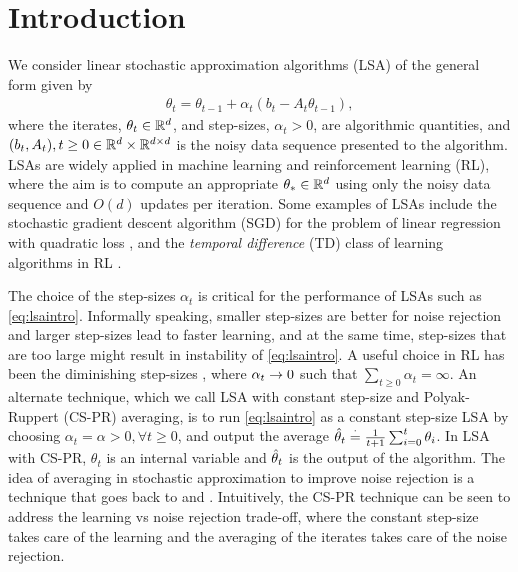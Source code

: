 \section{Introduction}
We consider linear stochastic approximation algorithms (LSA) of the general form given by
\begin{align}\label{eq:lsaintro}
\theta_t=\theta_{t-1}+\alpha_t (b_t-A_t \theta_{t-1}),
\end{align}
where the iterates, $\theta_t\in \mathbb{R}^d$, and step-sizes, $\alpha_t>0$, are algorithmic quantities, and $(b_t,A_t), t\geq 0\in \mathbb{R}^d\times \mathbb{R}^{d \times d}$ is the noisy data sequence presented to the algorithm.
LSAs are widely applied in machine learning and reinforcement learning (RL), where the aim is to compute an appropriate $\theta_*\in \mathbb{R}^d$ using only the noisy data sequence and $O(d)$ updates per iteration. Some examples of LSAs include the stochastic gradient descent algorithm (SGD) for the problem of linear regression with quadratic loss \cite{bach,bachaistats}, and the \emph{temporal difference} (TD) class of learning algorithms in RL \cite{sutton,konda-tsitsiklis,gtd,gtd2,gtdmp}.\par

The choice of the step-sizes $\alpha_t$ is critical for the performance of LSAs such as \eqref{eq:lsaintro}.
Informally speaking, smaller step-sizes are better for noise rejection and larger step-sizes lead to faster learning, and at the same time, step-sizes that are too large might result in instability of \eqref{eq:lsaintro}. A useful choice in RL has been the diminishing step-sizes \cite{gtd2,gtdmp,konda-tsitsiklis}, where $\alpha_t\rightarrow 0$ such that $\sum_{t\geq 0} \alpha_t=\infty$. An alternate technique, which we call LSA with constant step-size and Polyak-Ruppert (CS-PR) averaging, is to run \eqref{eq:lsaintro} as a constant step-size LSA by choosing $\alpha_t=\alpha>0,\forall t\geq 0$, and output the average $\hat{\theta}_t\stackrel{\cdot}{=}\frac{1}{t+1}\sum_{i=0}^t \theta_i$. In LSA with CS-PR, $\theta_t$ is an internal variable and $\hat{\theta}_t$ is the output of the algorithm. The idea of averaging in stochastic approximation to improve noise rejection is a technique that goes back to  \citet{ruppert} and \citet{polyak-judisky}. Intuitively, the CS-PR technique can be seen to address the learning vs noise rejection trade-off, where the constant step-size takes care of the learning  and the averaging of the iterates takes care of the noise rejection.
